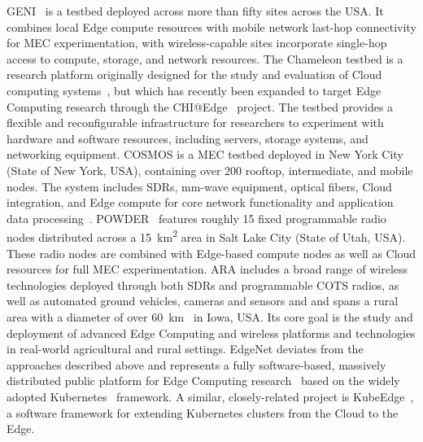 \gls{GENI}~\cite{berman2014geni,gosain2017geni} is a testbed deployed across more than fifty sites across the \gls{USA}.
It combines local Edge compute resources with mobile network last-hop connectivity for \gls{MEC} experimentation, with wireless-capable sites incorporate single-hop access to compute, storage, and network resources.
The Chameleon testbed is a research platform originally designed for the study and evaluation of Cloud computing systems~\cite{keahey2020lessons}, but which has recently been expanded to target Edge Computing research through the \acs{CHI}@Edge~\cite{chiatedge} project.
The testbed provides a flexible and reconfigurable infrastructure for researchers to experiment with hardware and software resources, including servers, storage systems, and networking equipment.
\gls{COSMOS} is a \gls{MEC} testbed deployed in New York City (State of New York, \gls{USA}), containing over \num{200} rooftop, intermediate, and mobile nodes.
The system includes \glspl{SDR}, \si{\milli\meter}-wave equipment, optical fibers, Cloud integration, and Edge compute for core network functionality and application data processing~\cite{yu2019cosmos,raychaudhuri2020challenge}.
\gls{POWDER}~\cite{breen2020powder} features roughly \num{15} fixed programmable radio nodes distributed across a \SI{15}{\kilo\meter\squared} area in Salt Lake City (State of Utah, \gls{USA}).
These radio nodes are combined with Edge-based compute nodes as well as Cloud resources for full \gls{MEC} experimentation.
\gls{ARA} includes a broad range of wireless technologies deployed through both \glspl{SDR} and programmable \gls{COTS} radios, as well as automated ground vehicles, cameras and sensors and and spans a rural area with a diameter of over \SI{60}{\kilo\meter}~\cite{zhang2022ara} in Iowa, \gls{USA}. 
Its core goal is the study and deployment of advanced Edge Computing and wireless platforms and technologies in real-world agricultural and rural settings.
EdgeNet deviates from the approaches described above and represents a fully software-based, massively distributed public platform for Edge Computing research~\cite{cappos2018edgenet,senel2021edgenet1,senel2021edgenet2} based on the widely adopted Kubernetes~\cite{kubernetes} framework.
A similar, closely-related project is KubeEdge~\cite{xiong2018extend}, a software framework for extending Kubernetes clusters from the Cloud to the Edge.

